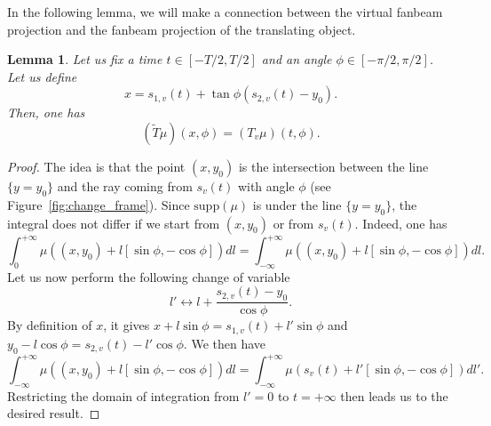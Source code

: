 \documentclass[a4paper]{article}
\numberwithin{equation}{section}
\newcommand{\supp}{\textrm{supp}}
\newtheorem{lemma}{Lemma}
\begin{document}
In the following lemma, we will make a connection between the virtual fanbeam projection and the fanbeam projection of the translating object.
\begin{lemma}
	Let us fix a time $t \in \left[ -T/2, T/2\right]$ and an angle $\phi \in \left[ -\pi/2, \pi/2\right]$. Let us define
	\begin{equation}
		x = s_{1,v}(t) + \tan \phi \left( s_{2,v}(t) - y_0 \right).
	\end{equation}
	Then, one has
	\begin{equation}
		\left( \tilde{T}\mu	\right)(x,\phi) = \left( T_v\mu	\right)(t,\phi).
	\end{equation}
\label{lem:T_x_t}
\end{lemma}
\begin{proof}
The idea is that the point $(x,y_0)$ is the intersection between the line $\{y=y_0\}$ and the ray coming from $s_v(t)$ with angle $\phi$ (see Figure~\ref{fig:change_frame}). Since $\supp(\mu)$ is under the line $\{ y=y_0 \}$, the integral does not differ if we start from $(x,y_0)$ or from $s_v(t)$. Indeed, one has
\begin{equation}
	\int_0^{+\infty} \mu \left( (x,y_0) + l \left[ \sin \phi, -\cos \phi \right] \right) dl = \int_{-\infty}^{+\infty} \mu \left( (x,y_0) + l \left[ \sin \phi, -\cos \phi \right] \right) dl.
\end{equation}
Let us now perform the following change of variable
\begin{equation}
	l' \leftrightarrow l + \frac{s_{2,v}(t) - y_0}{\cos \phi}.
\end{equation}
By definition of $x$, it gives $x + l \sin \phi = s_{1,v}(t) + l' \sin \phi$ and $y_0 - l \cos \phi = s_{2,v}(t) - l' \cos \phi$. We then have
\begin{equation}
	\int_{-\infty}^{+\infty} \mu \left( (x,y_0) + l \left[ \sin \phi, -\cos \phi \right] \right) dl = \int_{-\infty}^{+\infty} \mu \left( s_v(t) + l' \left[ \sin \phi, -\cos \phi \right] \right) dl'.
\end{equation}
Restricting the domain of integration from $l'=0$ to $t = + \infty$ then leads us to the desired result.
\end{proof}
\end{document}
